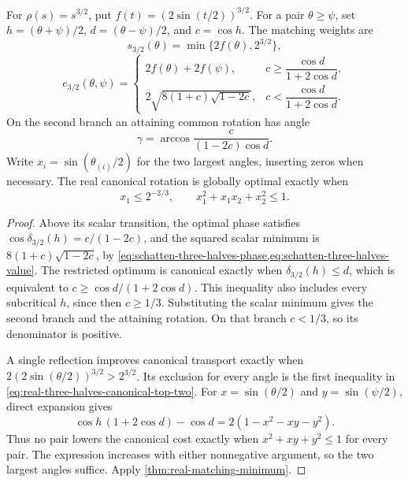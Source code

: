 \begin{corollary}
\label{cor:real-three-halves-matching}
For $\rho(s)=s^{3/2}$, put $f(t)=(2\sin(t/2))^{3/2}$.
For a pair $\theta\geq\psi$, set
$h=(\theta+\psi)/2$, $d=(\theta-\psi)/2$, and $c=\cos h$.
The matching weights are
\[
 s_{3/2}(\theta)=\min\{2f(\theta),2^{3/2}\},
\]
\[
 e_{3/2}(\theta,\psi)=
 \begin{cases}
  2f(\theta)+2f(\psi),&
       c\geq\dfrac{\cos d}{1+2\cos d},\\[3pt]
  2\sqrt{8(1+c)\sqrt{1-2c}},&
       c<\dfrac{\cos d}{1+2\cos d}.
 \end{cases}
\]
On the second branch an attaining common rotation has angle
\[
 \gamma=\arccos\frac{c}{(1-2c)\cos d}.
\]
Write $x_i=\sin(\theta_{(i)}/2)$ for the two largest angles, inserting
zeros when necessary. The real canonical rotation is globally optimal
exactly when
\begin{equation}
 x_1\leq2^{-2/3},\qquad x_1^2+x_1x_2+x_2^2\leq1.
 \label{eq:real-three-halves-canonical-top-two}
\end{equation}
\end{corollary}

\begin{proof}
Above its scalar transition, the optimal phase satisfies
$\cos\delta_{3/2}(h)=c/(1-2c)$, and the squared scalar minimum is
$8(1+c)\sqrt{1-2c}$, by
\cref{eq:schatten-three-halves-phase,eq:schatten-three-halves-value}.
The restricted optimum is canonical exactly when
$\delta_{3/2}(h)\leq d$, which is equivalent to
$c\geq\cos d/(1+2\cos d)$. This inequality also includes every
subcritical $h$, since then $c\geq1/3$. Substituting the scalar minimum
gives the second branch and the attaining rotation. On that branch
$c<1/3$, so its denominator is positive.

A single reflection improves canonical transport exactly when
$2(2\sin(\theta/2))^{3/2}>2^{3/2}$.
Its exclusion for every angle is the first inequality in
\cref{eq:real-three-halves-canonical-top-two}.
For $x=\sin(\theta/2)$ and $y=\sin(\psi/2)$, direct expansion gives
\[
 \cos h\,(1+2\cos d)-\cos d
       =2(1-x^2-xy-y^2).
\]
Thus no pair lowers the canonical cost exactly when
$x^2+xy+y^2\leq1$ for every pair. The expression increases with either
nonnegative argument, so the two largest angles suffice. Apply
\cref{thm:real-matching-minimum}.
\end{proof}

